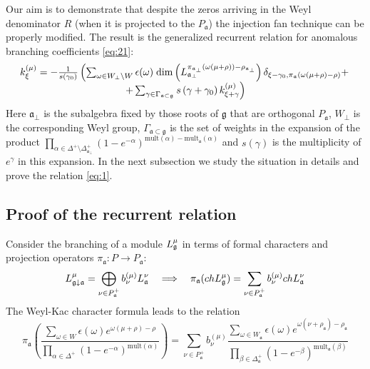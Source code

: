 \documentclass[12pt]{iopart}
\begin{document}
Our aim is to demonstrate that despite the zeros arriving in the Weyl denominator $R$
(when it is projected to the $P_{\mathfrak{a}}$) the injection fan technique \cite{ilyin812pbc} can be properly modified.
The result is the generalized recurrent relation for anomalous branching
coefficients \ref{eq:21}:
\begin{equation}
  \label{eq:1}
  \begin{array}{c}
      k_{\xi }^{\left( \mu \right) }=-\frac{1}{s\left( \gamma _{0}\right) }\left(
  \sum_{\omega\in W_{\bot}\backslash W} \epsilon(\omega)\; {\rm dim}\left(L^{\pi_{\mathfrak{a}_{\bot}}(\omega(\mu+\rho))-\rho_{\mathfrak{a}_{\bot}}}_{\mathfrak{a}_{\bot}}\right) \delta_{\xi-\gamma_0,\pi_{\mathfrak{a}}(\omega(\mu+\rho)-\rho)}+ \right.\\
\left.
+\sum_{\gamma \in
\Gamma _{\frak{a}\subset \frak{g}}}s\left( \gamma +\gamma _{0}\right) k_{\xi
+\gamma }^{\left( \mu \right) }\right)
  \end{array}
   \end{equation}
Here $\mathfrak{a}_{\bot}$ is the subalgebra fixed by those roots of $\mathfrak{g}$ that are
orthogonal $P_{\mathfrak{a}}$, $W_{\bot}$ is the corresponding Weyl group,
$\Gamma_{\mathfrak{a}\subset \mathfrak{g}}$ is the set of weights in the expansion
of the product $\prod_{\alpha\in \Delta^{+}\setminus \Delta^{+}_{\mathfrak{a}_{\bot}}}
(1-e^{-\alpha})^{\mathrm{mult}(\alpha)-\mathrm{mult}_{\mathfrak{a}}(\alpha)}$ and $s(\gamma)$
is the multiplicity of $e^{\gamma}$ in this expansion.
In the next subsection we study the situation in details and prove the relation \ref{eq:1}.

\subsection{Proof of the recurrent relation}
\label{sec:proof}

Consider the branching of a module $L_{\frak{g}}^{\mu }$ in terms of formal characters and
projection operators $\pi_{\mathfrak{a}}:P\to P_{\mathfrak{a}}$:
\begin{equation}
  \label{eq:3}
  L_{\frak{g}\downarrow \frak{a}}^{\mu }=\bigoplus\limits_{\nu \in P_{\frak{a}%
    }^{+}}b_{\nu }^{\left( \mu \right) }L_{\frak{a}}^{\nu }\quad
  \Longrightarrow\quad
  \pi_{\mathfrak{a}}(ch L^{\mu}_{\mathfrak{g}})=
  \sum_{\nu\in P^{+}_{\mathfrak{a}}}b^{(\mu)}_{\nu} ch L^{\nu}_{\mathfrak{a}}
\end{equation}
The Weyl-Kac character formula leads to
the relation
\begin{equation}
  \label{eq:4}
  \pi_{\mathfrak{a}}\left(\frac{\sum_{\omega\in W} \epsilon(\omega) e^{\omega(\mu+\rho)-\rho}}
  {\prod_{\alpha\in\Delta^{+}}(1-e^{-\alpha})^{\mathrm{mult}(\alpha)}}\right) =
  \sum_{\nu\in P^{+}_{\mathfrak{a}}}b^{(\mu)}_{\nu}
  \frac{\sum_{\omega\in W_{\mathfrak{a}}}\epsilon(\omega)
  e^{\omega(\nu+\rho_{\mathfrak{a}})-\rho_{\mathfrak{a}}}}
  {\prod_{\beta\in \Delta_{\mathfrak{a}}^{+}}(1-e^{-\beta})^{\mathrm{mult}_{\mathfrak{a}}(\beta)}}
\end{equation}
\end{document}
